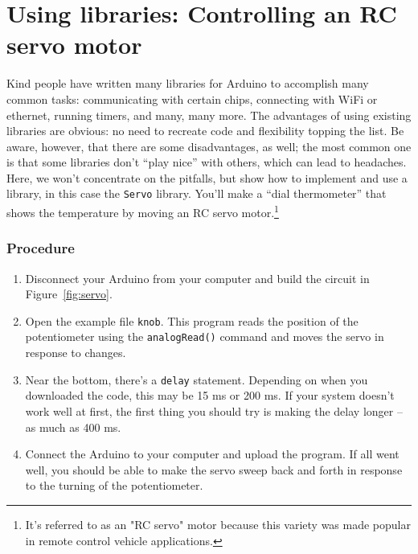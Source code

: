 \documentclass[11pt]{article} %
\begin{document}
\section*{Using libraries: Controlling an RC servo motor}

Kind people have written many libraries for Arduino to accomplish many common tasks: communicating with certain chips, connecting with WiFi or ethernet, running timers, and many, many more. The advantages of using existing libraries are obvious: no need to recreate code and flexibility topping the list. Be aware, however, that there are some disadvantages, as well; the most common one is that some libraries don’t “play nice” with others, which can lead to headaches. Here, we won’t concentrate on the pitfalls, but show how to implement and use a library, in this case the \verb|Servo| library. You’ll make a “dial thermometer” that shows the temperature by moving an RC servo motor.\footnote{It's referred to as an "RC servo" motor because this variety was made popular in remote control vehicle applications.}

\subsubsection*{Procedure}

\begin{enumerate}
\item Disconnect your Arduino from your computer and build the circuit in Figure~\ref{fig:servo}.
\item Open the example file \verb|knob|. This program reads the position of the potentiometer using the \verb|analogRead()| command and moves the servo in response to changes.
\item Near the bottom, there's a \verb|delay| statement. Depending on when you downloaded the code, this may be 15 ms or 200 ms. If your system doesn't work well at first, the first thing you should try is making the delay longer -- as much as 400 ms.
\item Connect the Arduino to your computer and upload the program. If all went well, you should be able to make the servo sweep back and forth in response to the turning of the potentiometer.
\end{enumerate}
\end{document}
